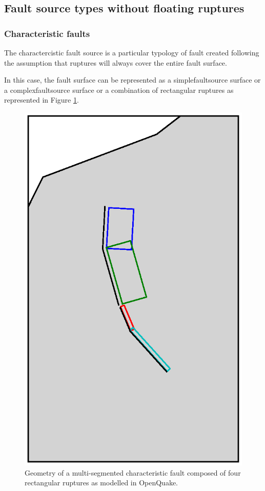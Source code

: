 \subsection{Fault source types without floating ruptures}
\subsubsection{Characteristic faults}
The charactercistic fault source is a particular typology of fault
created following the assumption that ruptures will always cover 
the entire fault surface. 

In this case, the fault surface can be represented as a 
\gls{simplefaultsource} surface or a \gls{complexfaultsource} 
surface or a combination of rectangular ruptures as represented 
in Figure \ref{fig:char_fault_source}.
\begin{figure}[!ht]
\centering
\includegraphics[width=15cm]{./figures/hazard/multi_surface.ps}
\caption{Geometry of a multi-segmented characteristic fault composed of four
	rectangular ruptures as modelled in OpenQuake.}
\label{fig:char_fault_source}
\end{figure}
